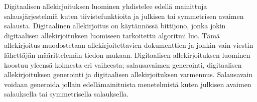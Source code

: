  Digitaalisen allekirjoituksen luominen yhdistelee edellä mainittuja salausjärjestelmiä kuten tiivistefunktioita ja julkisen tai symmetrisen avaimen salausta. Digitaalinen allekirjoitus on käytännössä bittijono, jonka jokin digitaalisen allekirjoituksen luomiseen tarkoitettu algoritmi luo. Tämä allekirjoitus muodostetaan allekirjoitettavien dokumenttien ja jonkin vain viestin lähettäjän määrittelemän tiedon mukaan. Digitaalisen allekirjoituksen luominen koostuu yleensä kolmesta eri vaiheesta; salausavaimen generointi, digitaalisen allekirjoituksen generointi ja digitaalisen allekirjoituksen varmennus. Salausavain voidaan generoida jollain edellämainituista menetelmistä kuten julkisen avaimen salauksella tai symmetrisella salauksella.